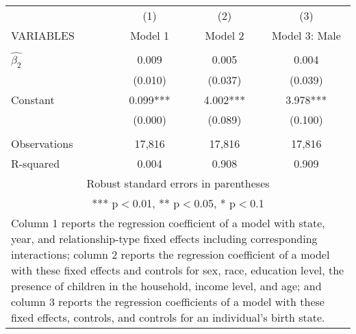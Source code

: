 \begin{tabular}{lccc}
\hline
 & (1) & (2) & (3) \\
VARIABLES & Model 1 & Model 2 & Model 3: Male \\ \hline
 &  &  &  \\
$\hat{\beta_2}$ & 0.009 & 0.005 & 0.004 \\
 & (0.010) & (0.037) & (0.039) \\
Constant & 0.099*** & 4.002*** & 3.978*** \\
 & (0.000) & (0.089) & (0.100) \\
 &  &  &  \\
Observations & 17,816 & 17,816 & 17,816 \\
 R-squared & 0.004 & 0.908 & 0.909 \\ \hline
\multicolumn{4}{c}{ Robust standard errors in parentheses} \\
\multicolumn{4}{c}{ *** p$<$0.01, ** p$<$0.05, * p$<$0.1} \\
\multicolumn{4}{p{0.8\linewidth}}{\small Column 1 reports the regression coefficient of a model with state, year, and relationship-type fixed effects including corresponding interactions; column 2 reports the regression coefficient of a model with these fixed effects and controls for sex, race, education level, the presence of children in the household, income level, and age; and column 3 reports the regression coefficients of a model with these fixed effects, controls, and controls for an individual’s birth state.} \\
\end{tabular}
